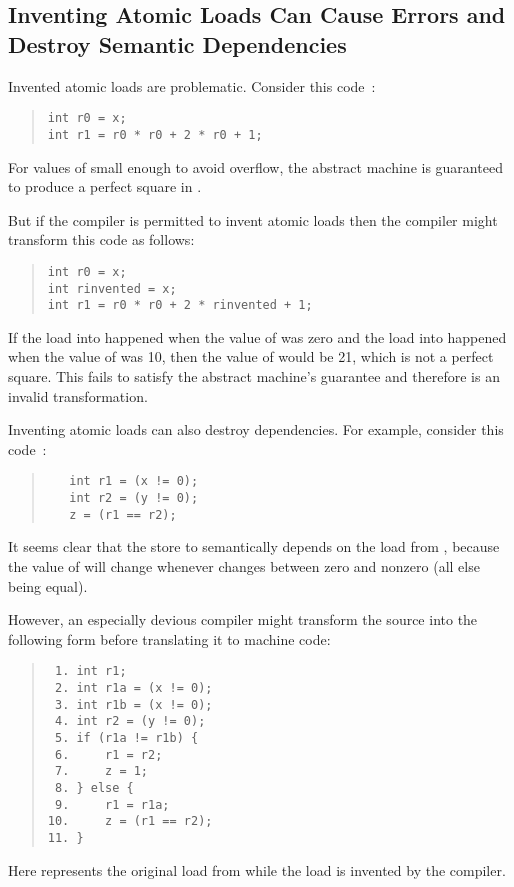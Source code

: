 \subsection{Inventing Atomic Loads Can Cause Errors and
Destroy Semantic Dependencies}
\label{sec:Inventing Atomic Loads Can Cause Errors and
Destroy Semantic Dependencies}

Invented atomic loads are problematic.
Consider this code~\cite{PaulEMcKenney2023P3046R2/OOTAwithoutTrying}:
\begin{quote}
\begin{verbatim}
int r0 = x;
int r1 = r0 * r0 + 2 * r0 + 1;
\end{verbatim}
\end{quote}
For values of  small enough to avoid overflow, the abstract machine is
guaranteed to produce a perfect square in .

But if the compiler is permitted to invent atomic loads then the compiler
might transform this code as follows:
\begin{quote}
\begin{verbatim}
int r0 = x;
int rinvented = x;
int r1 = r0 * r0 + 2 * rinvented + 1;
\end{verbatim}
\end{quote}
If the load into  happened when the value of 
was zero and the load into  happened when the value of
 was 10, then the value of  would be 21, which is not
a perfect square.
This fails to satisfy the abstract machine's guarantee
and therefore is an invalid transformation.

Inventing atomic loads can also destroy dependencies.
For example, consider this code~\cite{PaulEMcKenney2023P3046R2/OOTAwithoutTrying}:
\begin{quote}
\begin{verbatim}
   int r1 = (x != 0);
   int r2 = (y != 0);
   z = (r1 == r2);
\end{verbatim}
\end{quote}
It seems clear that the store to  semantically depends on the load
from , because the value of  will change whenever 
changes between zero and nonzero (all else being equal).

However, an especially devious compiler might transform the source into
the following form before translating it to machine code:
\begin{quote}
\begin{verbatim}
 1. int r1;
 2. int r1a = (x != 0);
 3. int r1b = (x != 0);
 4. int r2 = (y != 0);
 5. if (r1a != r1b) {
 6.     r1 = r2;
 7.     z = 1;
 8. } else {
 9.     r1 = r1a;
10.     z = (r1 == r2);
11. }
\end{verbatim}
\end{quote}
Here  represents the original load from  while the 
load is invented by the compiler.

